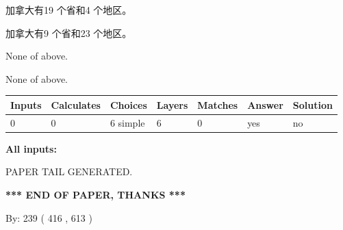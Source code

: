 \documentclass{ctexart}
\begin{document}
 
加拿大有19 个省和4 个地区。
 
 
加拿大有9 个省和23 个地区。
 
 
 None of above.
 
 
\noindent{}
 
 
 None of above.
 
 
\noindent{}
 
 
   
   
   
   
\noindent\begin{tabular}{|l|l|l|l|l|l|l|}
 \hline
Inputs & Calculates & Choices & Layers & Matches & Answer & Solution \\ \hline
 0  & 
 0  & 
 6
  simple  
  & 
 6  & 
 0  & 
  yes & 
  no 
  \\ \hline
 \end{tabular}
   
   
   
   
\noindent{}
   
   
   
   
\noindent\vspace{0.1in}\hspace{-0.08in} {\textbf{\Large{All inputs: }}}
   
   
   
   
   
   
 \vspace{0.2in}
 
   
   
\vspace{2.0in} PAPER TAIL GENERATED.
   
   
   
   
\vspace{1.0in} 
{\textbf{\large{ *** END OF PAPER, THANKS *** }}} 
   
   
\hspace{1.0in} By: 
 239 ( 416 ,  613 )
   
   
   
   
\newpage 
\setcounter{page}{ 
   469001 } 
   
   
   
\end{document}
